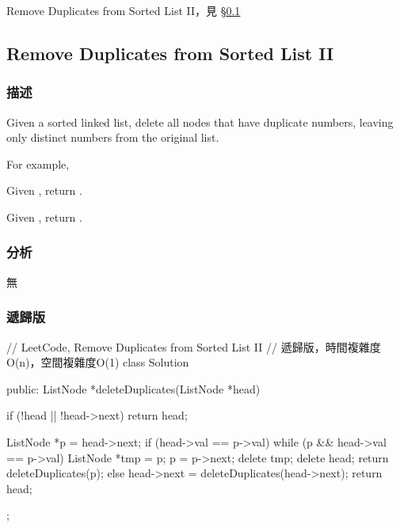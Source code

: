 \begindot
\item Remove Duplicates from Sorted List II，見 \S \ref{sec:remove-duplicates-from-sorted-list-ii}
\myenddot


\subsection{Remove Duplicates from Sorted List II}
\label{sec:remove-duplicates-from-sorted-list-ii}


\subsubsection{描述}
Given a sorted linked list, delete all nodes that have duplicate numbers, leaving only distinct numbers from the original list.

For example,

Given , return .

Given , return .


\subsubsection{分析}
無


\subsubsection{遞歸版}
\begin{Code}
// LeetCode, Remove Duplicates from Sorted List II
// 遞歸版，時間複雜度O(n)，空間複雜度O(1)
class Solution {
public:
    ListNode *deleteDuplicates(ListNode *head) {
        if (!head || !head->next) return head;

        ListNode *p = head->next;
        if (head->val == p->val) {
            while (p && head->val == p->val) {
                ListNode *tmp = p;
                p = p->next;
                delete tmp;
            }
            delete head;
            return deleteDuplicates(p);
        } else {
            head->next = deleteDuplicates(head->next);
            return head;
        }
    }
};
\end{Code}


